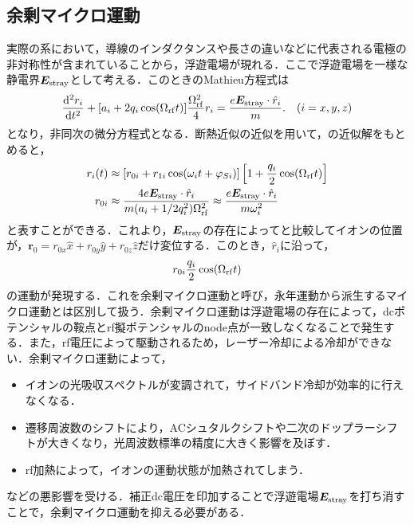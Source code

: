 \subsection{余剰マイクロ運動}
実際の系において，導線のインダクタンスや長さの違いなどに代表される電極の非対称性が含まれていることから，浮遊電場が現れる．ここで浮遊電場を一様な静電界$\bm{E}_{\rm stray}$として考える．このときのMathieu方程式は
\large
\begin{align}\label{eq:stray_mathieu_eq}
	\frac{{\rm d^2}r_i}{{\rm d}t^2} + [a_i + 2q_i \cos (\Omega_{\rm rf} t)]\frac{\Omega_{\rm rf}^2}{4}r_i = \frac{e\bm{E}_{\rm stray}\cdot \hat{r}_i}{m}. \quad (i = x,y,z)
\end{align}
\normalsize
となり，非同次の微分方程式となる．断熱近似の近似を用いて，の近似解をもとめると，
\large
\begin{align}\label{eq:stray_mathieu_kai}
r_i(t) &\approx [r_{0i} + r_{1i}\cos(\omega_i t + \varphi_{Si})]\left[ 1 + \frac{q_i}{2}\cos(\Omega_{\rm rf} t)\right]  \\
r_{0i} &\approx \frac{4e \bm{E}_{\rm stray} \cdot \hat{r}_i}{m(a_i + 1/2 q^2_i)\Omega_{\rm rf}^2} \approx \frac{e \bm{E}_{\rm stray} \cdot \hat{r}_i}{m\omega_i^2}
\end{align}
\normalsize
と表すことができる．これより，$\bm{E}_{\rm stray}$の存在によってと比較してイオンの位置が，$\bm{r}_0 = r_{0x}\hat{x} + r_{0y}\hat{y} + r_{0z}\hat{z}$だけ変位する．このとき，$\hat{r}_i$に沿って，
\large
\begin{align}
r_{0i}\frac{q_i}{2} \cos(\Omega_{\rm rf}t)
\end{align}
\normalsize
の運動が発現する\cite{Berkeland_1998}．これを余剰マイクロ運動と呼び，永年運動から派生するマイクロ運動とは区別して扱う．余剰マイクロ運動は浮遊電場の存在によって，dcポテンシャルの鞍点とrf擬ポテンシャルのnode点が一致しなくなることで発生する．また，rf電圧によって駆動されるため，レーザー冷却による冷却ができない．余剰マイクロ運動によって，
\begin{itemize}
\item イオンの光吸収スペクトルが変調されて，サイドバンド冷却が効率的に行えなくなる．
\item 遷移周波数のシフトにより，ACシュタルクシフトや二次のドップラーシフトが大きくなり，光周波数標準の精度に大きく影響を及ぼす．
\item rf加熱によって，イオンの運動状態が加熱されてしまう．
\end{itemize}
などの悪影響を受ける\cite{Timm_2015}．補正dc電圧を印加することで浮遊電場$\bm{E}_{\rm stray}$を打ち消すことで，余剰マイクロ運動を抑える必要がある．

